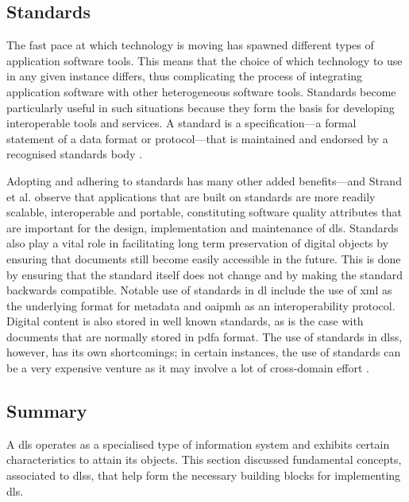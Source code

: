 \subsection{Standards}
\label{sec:background:fundamental-concepts:standards}

The fast pace at which technology is moving has spawned different types of application software tools. This means that the choice of which technology to use in any given instance differs, thus complicating the process of integrating application software with other heterogeneous software tools. Standards become particularly useful in such situations because they form the basis for developing interoperable tools and services. A standard is a specification---a formal statement of a data format or protocol---that is maintained and endorsed by a recognised standards body \citep[see][chap. 2]{Suleman2010}⁠.

Adopting and adhering to standards has many other added benefits---and Strand et al. \citep{Strand1994} observe that applications that are built on standards are more readily scalable, interoperable and portable, constituting software quality attributes that are important for the design, implementation and maintenance of \glspl{dl}. Standards also play a vital role in facilitating long term preservation of digital objects by ensuring that documents still become easily accessible in the future. This is done by ensuring that the standard itself does not change and by making the standard backwards compatible. Notable use of standards in \gls{dl}  include the use of \gls{xml} as the underlying format for metadata and \gls{oaipmh} as an interoperability protocol. Digital content is also stored in well known standards, as is the case with documents that are normally stored in \gls{pdfa} format. The use of standards in \glspl{dls}, however, has its own shortcomings; in certain instances, the use of standards can be a very expensive venture as it may involve a lot of cross-domain effort \citep{Lorist2001}⁠.

\subsection{Summary}
\label{sec:background:fundamental-concepts:summary}

A \gls{dls} operates as a specialised type of information system and exhibits certain characteristics to attain its objects. This section discussed fundamental concepts, associated to \glspl{dls}, that help form the necessary building blocks for implementing \glspl{dl}.